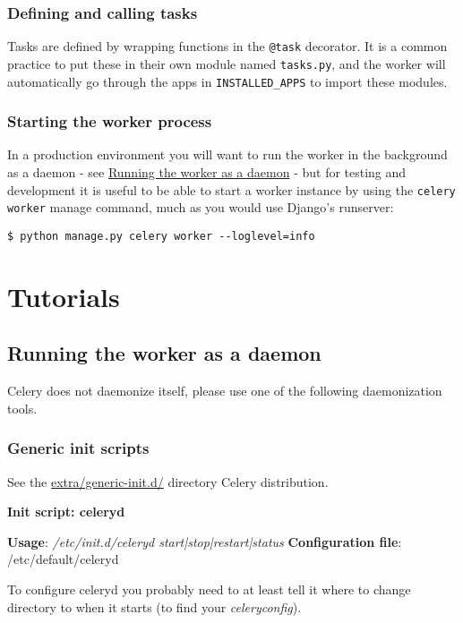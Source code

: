 \documentclass[9pt,a4paper]{article}
\begin{document}
\begin{CJK*}{GBK}{kai}
\subsubsection{Defining and calling tasks}

Tasks are defined by wrapping functions in the \verb"@task" decorator. It is a common practice to put these in their own module named \verb"tasks.py", and the worker will automatically go through the apps in \verb"INSTALLED_APPS" to import these modules.

\subsubsection{Starting the worker process}

In a production environment you will want to run the worker in the background as a daemon - see \href{http://docs.celeryproject.org/en/latest/tutorials/daemonizing.html#daemonizing}{Running the worker as a daemon} - but for testing and development it is useful to be able to start a worker instance by using the \verb"celery worker" manage command, much as you would use Django’s runserver:

\begin{Verbatim}[frame=single]
$ python manage.py celery worker --loglevel=info
\end{Verbatim}

\section{Tutorials}

\subsection{Running the worker as a daemon}
Celery does not daemonize itself, please use one of the following daemonization tools.

\subsubsection{Generic init scripts}
See the \href{https://github.com/celery/celery/tree/3.0/extra/generic-init.d/}{extra/generic-init.d/} directory Celery distribution.

\textbf{Init script: celeryd}

\textbf{Usage}: \textit{/etc/init.d/celeryd {start|stop|restart|status}}
\textbf{Configuration file}: /etc/default/celeryd

To configure celeryd you probably need to at least tell it where to change directory to when it starts (to find your \textit{celeryconfig}).


\end{CJK*}
\end{document}
